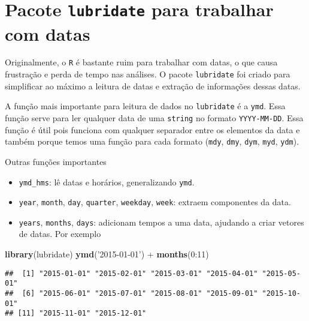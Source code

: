 \documentclass[]{book}
\newenvironment{Shaded}{\begin{snugshade}}{\end{snugshade}}
\newcommand{\KeywordTok}[1]{\textcolor[rgb]{0.13,0.29,0.53}{\textbf{{#1}}}}
\newcommand{\DecValTok}[1]{\textcolor[rgb]{0.00,0.00,0.81}{{#1}}}
\newcommand{\StringTok}[1]{\textcolor[rgb]{0.31,0.60,0.02}{{#1}}}
\newcommand{\NormalTok}[1]{{#1}}
\providecommand{\tightlist}{%
  \setlength{\itemsep}{0pt}\setlength{\parskip}{0pt}}
\begin{document}
\section{\texorpdfstring{Pacote \texttt{lubridate} para trabalhar com
datas}{Pacote lubridate para trabalhar com datas}}\label{pacote-lubridate-para-trabalhar-com-datas}

Originalmente, o \texttt{R} é bastante ruim para trabalhar com datas, o
que causa frustração e perda de tempo nas análises. O pacote
\texttt{lubridate} foi criado para simplificar ao máximo a leitura de
datas e extração de informações dessas datas.

A função mais importante para leitura de dados no \texttt{lubridate} é a
\texttt{ymd}. Essa função serve para ler qualquer data de uma
\texttt{string} no formato \texttt{YYYY-MM-DD}. Essa função é útil pois
funciona com qualquer separador entre os elementos da data e também
porque temos uma função para cada formato (\texttt{mdy}, \texttt{dmy},
\texttt{dym}, \texttt{myd}, \texttt{ydm}).

Outras funções importantes

\begin{itemize}
\tightlist
\item
  \texttt{ymd\_hms}: lê datas e horários, generalizando \texttt{ymd}.
\item
  \texttt{year}, \texttt{month}, \texttt{day}, \texttt{quarter},
  \texttt{weekday}, \texttt{week}: extraem componentes da data.
\item
  \texttt{years}, \texttt{months}, \texttt{days}: adicionam tempos a uma
  data, ajudando a criar vetores de datas. Por exemplo
\end{itemize}

\begin{Shaded}
\begin{Highlighting}[]
\KeywordTok{library}\NormalTok{(lubridate)}
\KeywordTok{ymd}\NormalTok{(}\StringTok{'2015-01-01'}\NormalTok{) +}\StringTok{ }\KeywordTok{months}\NormalTok{(}\DecValTok{0}\NormalTok{:}\DecValTok{11}\NormalTok{)}
\end{Highlighting}
\end{Shaded}

\begin{verbatim}
##  [1] "2015-01-01" "2015-02-01" "2015-03-01" "2015-04-01" "2015-05-01"
##  [6] "2015-06-01" "2015-07-01" "2015-08-01" "2015-09-01" "2015-10-01"
## [11] "2015-11-01" "2015-12-01"
\end{verbatim}
\end{document}

